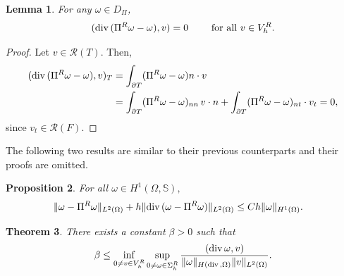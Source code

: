 \documentclass[12pt]{amsart}
\numberwithin{equation}{section}
\newcommand{\og}{\omega}
\newtheorem{theorem}{Theorem}[section]
\newtheorem{lemma}[theorem]{Lemma}
\newtheorem{proposition}[theorem]{Proposition}
\theoremstyle{definition}
\theoremstyle{remark}
\newcommand{\om}{{\Omega}}
\renewcommand{\(}{\bigl(}
\renewcommand{\)}{\bigr)}
\newcommand{\dive}{{\ensuremath\mathop{\mathrm{div}\,}}} %
\newcommand{\bn}{n}
\newcommand{\RM}{\mathcal{R}}
\begin{document}
\begin{lemma}
For any $\og \in D_\Pi$, 
\begin{equation}\label{commutePiglobalR}
 (\dive( \Pi^R \omega -\omega),  v) =0 \qquad {\text{ for all }} v \in V_h^R.
\end{equation}
\end{lemma}
\begin{proof}
Let $v \in \RM(T)$. Then, 
\begin{alignat*}{2}
(\dive( \Pi^R \omega -\omega), v)_T
& =  \int_{\partial T } (\Pi^R \omega -\omega) \bn \cdot v   \\
& =  \int_{\partial T } (\Pi^R \omega -\omega)_{nn}   \, v \cdot \bn+ \int_{\partial T } (\Pi^R \omega -\omega)_{nt} \cdot v_t  =  0,
\end{alignat*}
since  $v_t \in \RM(F)$. 
\end{proof}

The following two results are similar to their previous counterparts and
their proofs are omitted.
\begin{proposition} 
 For all $\og \in H^1(\om, \mathbb S), $
    \begin{alignat}{2} \label{PiboundR}
      \| \omega-\Pi^R \omega\|_{L^2(\Omega)}+ h \|\dive(\omega-\Pi^R \omega)\|_{L^2(\Omega)} & \le   C h \|\omega\|_{H^1(\Omega)}.
    \end{alignat}
\end{proposition}
\begin{theorem}  
    There exists a constant $\beta>0$ such that 
   \[
      \beta \le \inf_{0\not = v\in V^R_h} \sup_{0 \neq \omega \in \Sigma_h^R}  \frac{( \dive \omega, v)}{\|\omega\|_{H(\dive,\Omega)} \|v\|_{L^2(\Omega)} } . 
    \]
\end{theorem}
\end{document}
